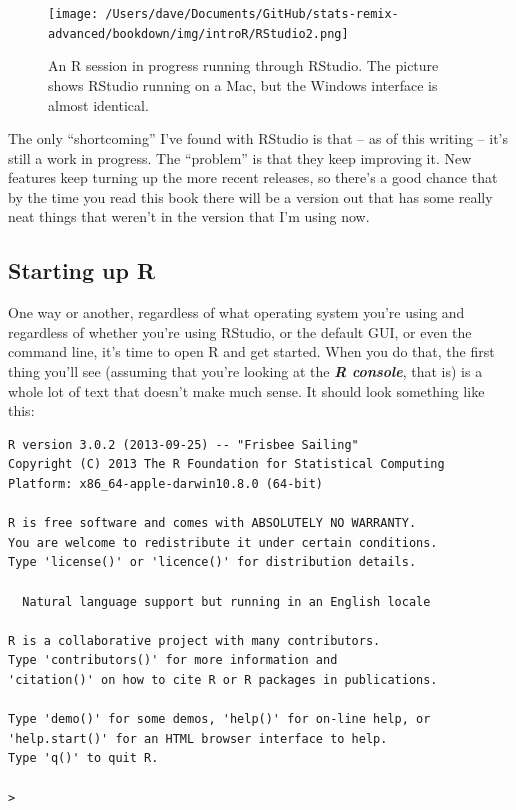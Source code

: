 \documentclass[
]{book}
\begin{document}
\begin{figure}
\centering
\texttt{[image: /Users/dave/Documents/GitHub/stats-remix-advanced/bookdown/img/introR/RStudio2.png]}
\caption{\label{fig:RStudio}An R session in progress running through RStudio. The picture shows RStudio running on a Mac, but the Windows interface is almost identical.}
\end{figure}

The only ``shortcoming'' I've found with RStudio is that -- as of this writing -- it's still a work in progress. The ``problem'' is that they keep improving it. New features keep turning up the more recent releases, so there's a good chance that by the time you read this book there will be a version out that has some really neat things that weren't in the version that I'm using now.

\hypertarget{startingR}{%
\subsection{Starting up R}\label{startingR}}

One way or another, regardless of what operating system you're using and regardless of whether you're using RStudio, or the default GUI, or even the command line, it's time to open R and get started. When you do that, the first thing you'll see (assuming that you're looking at the \textbf{\emph{R console}}, that is) is a whole lot of text that doesn't make much sense. It should look something like this:

\begin{verbatim}
R version 3.0.2 (2013-09-25) -- "Frisbee Sailing"
Copyright (C) 2013 The R Foundation for Statistical Computing
Platform: x86_64-apple-darwin10.8.0 (64-bit)

R is free software and comes with ABSOLUTELY NO WARRANTY.
You are welcome to redistribute it under certain conditions.
Type 'license()' or 'licence()' for distribution details.

  Natural language support but running in an English locale

R is a collaborative project with many contributors.
Type 'contributors()' for more information and
'citation()' on how to cite R or R packages in publications.

Type 'demo()' for some demos, 'help()' for on-line help, or
'help.start()' for an HTML browser interface to help.
Type 'q()' to quit R.

> 
\end{verbatim}
\end{document}
